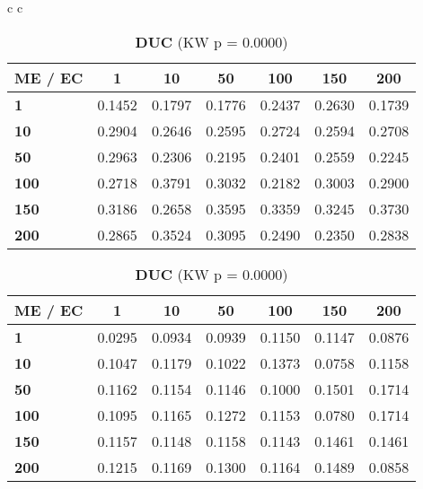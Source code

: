 \begin{table}[h]
\begin{tabular}{c c}
\begin{subtable}[t]{0.48\textwidth}
\begin{tabular}{lcccccc}
\toprule
\textbf{ME / EC} & 1 & 10 & 50 & 100 & 150 & 200 \\
\midrule
\textbf{1} & 0.1452 & 0.1797 & 0.1776 & 0.2437 & 0.2630 & 0.1739 \\
\textbf{10} & 0.2904 & 0.2646 & 0.2595 & 0.2724 & 0.2594 & 0.2708 \\
\textbf{50} & 0.2963 & 0.2306 & 0.2195 & 0.2401 & 0.2559 & 0.2245 \\
\textbf{100} & 0.2718 & 0.3791 & 0.3032 & 0.2182 & 0.3003 & 0.2900 \\
\textbf{150} & 0.3186 & 0.2658 & 0.3595 & 0.3359 & 0.3245 & 0.3730 \\
\textbf{200} & 0.2865 & 0.3524 & 0.3095 & 0.2490 & 0.2350 & 0.2838 \\
\bottomrule
\end{tabular}
\end{subtable}
\begin{subtable}[t]{0.48\textwidth}
\centering
\caption*{\textbf{DUC} (KW p = 0.0000)}
\begin{tabular}{lcccccc}
\toprule
\textbf{ME / EC} & 1 & 10 & 50 & 100 & 150 & 200 \\
\midrule
\textbf{1} & 0.0295 & 0.0934 & 0.0939 & 0.1150 & 0.1147 & 0.0876 \\
\textbf{10} & 0.1047 & 0.1179 & 0.1022 & 0.1373 & 0.0758 & 0.1158 \\
\textbf{50} & 0.1162 & 0.1154 & 0.1146 & 0.1000 & 0.1501 & 0.1714 \\
\textbf{100} & 0.1095 & 0.1165 & 0.1272 & 0.1153 & 0.0780 & 0.1714 \\
\textbf{150} & 0.1157 & 0.1148 & 0.1158 & 0.1143 & 0.1461 & 0.1461 \\
\textbf{200} & 0.1215 & 0.1169 & 0.1300 & 0.1164 & 0.1489 & 0.0858 \\
\bottomrule
\end{tabular}
\end{subtable}
\end{tabular}
\end{table}
